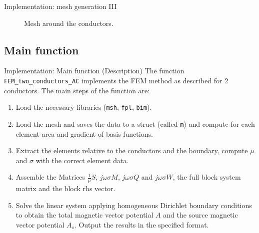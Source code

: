 \documentclass[aspectratio=54,xcolor=dvipsnames]{beamer}
\begin{document}
\begin{frame}{Implementation: mesh generation III}
\begin{center}
\begin{minipage}{0.48\textwidth}
\begin{figure}
                \caption{Mesh around the conductors.}
                \label{fig:mesh_cond}
            \end{figure}
        \end{minipage}
    \end{center}
\end{frame}

\subsection{Main function}
\begin{frame}{Implementation: Main function (Description)}
    The function \texttt{FEM\_two\_conductors\_AC} implements the FEM method as described for 2 conductors. The main steps of the function are:
    \begin{enumerate}
        \item Load the necessary libraries (\texttt{msh}, \texttt{fpl}, \texttt{bim}).
        \item Load the mesh and saves the data to a struct (called \texttt{m}) and compute for each element area and gradient of basis functions.
        \item Extract the elements relative to the conductors and the boundary, compute $\mu$ and $\sigma$ with the correct element data.
        \item Assemble the Matrices $\frac{1}{\mu}S$, $j \omega \sigma M$, $j \omega \sigma Q$ and $j \omega \sigma W$, the full block system matrix and the block rhs vector.
        \item Solve the linear system applying homogeneous Dirichlet boundary conditions to obtain the total magnetic vector potential $A$ and the source magnetic vector potential $A_s$. Output the results in the specified format.
    \end{enumerate} 
\end{frame}
\end{document}
